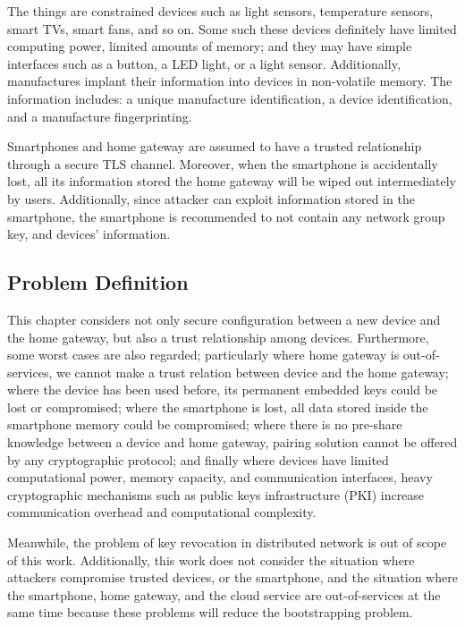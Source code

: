 The things are constrained devices such as light sensors, temperature sensors, smart TVs, smart fans, and so on. Some such these devices definitely have limited computing power, limited amounts of memory; and they may have simple interfaces such as a button, a LED light, or a light sensor. Additionally, manufactures implant their information into devices in non-volatile memory. The information includes: a unique manufacture identification, a device identification, and a manufacture fingerprinting.

Smartphones and home gateway are assumed to have a trusted relationship through a secure TLS channel. Moreover, when the smartphone is accidentally lost, all its information stored the home gateway will be wiped out intermediately by users. Additionally, since attacker can exploit information stored in the smartphone, the smartphone is recommended to not contain any network group key, and devices' information. 

\subsection{Problem Definition}

This chapter considers not only secure configuration between a new device and the home gateway, but also a trust relationship among devices. Furthermore, some worst cases are also regarded; particularly where home gateway is out-of-services, we cannot make a trust relation between device and the home gateway; where the device has been used before, its permanent embedded keys could be lost or compromised; where the smartphone is lost, all data stored inside the smartphone memory could be compromised; where there is no pre-share knowledge between a device and home gateway, pairing solution cannot be offered by any cryptographic protocol; and finally where devices have limited computational power, memory capacity, and communication interfaces, heavy cryptographic mechanisms such as public keys infrastructure (PKI) increase communication overhead and computational complexity.  

Meanwhile, the problem of key revocation in distributed network is out of scope of this work. Additionally, this work does not consider the situation where attackers compromise trusted devices, or the smartphone, and the situation where the smartphone, home gateway, and the cloud service are out-of-services at the same time because these problems will reduce the bootstrapping problem. 

